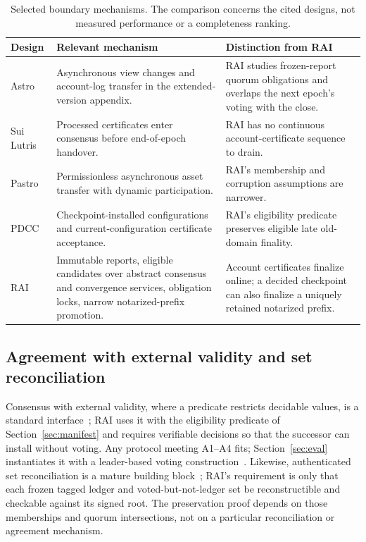 \begin{table}[t]
\caption{Selected boundary mechanisms. The comparison concerns the cited designs, not measured performance or a completeness ranking.}
\label{tab:related}
\begin{tabularx}{\textwidth}{@{}p{0.84in}YY@{}}
\toprule
Design & Relevant mechanism & Distinction from RAI\\
\midrule
Astro~\cite{astro} & Asynchronous view changes and account-log transfer in the extended-version appendix. & RAI studies frozen-report quorum obligations and overlaps the next epoch's voting with the close.\\
Sui Lutris~\cite{lutris} & Processed certificates enter consensus before end-of-epoch handover. & RAI has no continuous account-certificate sequence to drain.\\
Pastro~\cite{pastro} & Permissionless asynchronous asset transfer with dynamic participation. & RAI's membership and corruption assumptions are narrower.\\
PDCC~\cite{pdcc} & Checkpoint-installed configurations and current-configuration certificate acceptance. & RAI's eligibility predicate preserves eligible late old-domain finality.\\
RAI & Immutable reports, eligible candidates over abstract consensus and convergence services, obligation locks, narrow notarized-prefix promotion. & Account certificates finalize online; a decided checkpoint can also finalize a uniquely retained notarized prefix.\\
\bottomrule
\end{tabularx}
\end{table}

\subsection{Agreement with external validity and set reconciliation}
Consensus with external validity, where a predicate restricts decidable values, is a standard interface~\cite{externalvalidity}; RAI uses it with the eligibility predicate of Section~\ref{sec:manifest} and requires verifiable decisions so that the successor can install without voting. Any protocol meeting A1--A4 fits; Section~\ref{sec:eval} instantiates it with a leader-based voting construction~\cite{simplex,kudzu}. Likewise, authenticated set reconciliation is a mature building block~\cite{iblt,whatsthedifference,rateless}; RAI's requirement is only that each frozen tagged ledger and voted-but-not-ledger set be reconstructible and checkable against its signed root. The preservation proof depends on those memberships and quorum intersections, not on a particular reconciliation or agreement mechanism.
